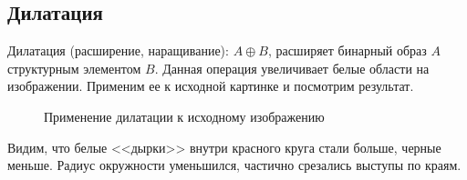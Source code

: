 \documentclass[a4paper, 12pt]{article}
\begin{document}
    \subsection{Дилатация}
    Дилатация (расширение, наращивание): $A\oplus B$, расширяет бинарный образ $A$ структурным элементом $B$. Данная операция
    увеличивает белые области на изображении. Применим ее к исходной картинке и посмотрим результат.
    \begin{figure}[H]
        \centering
        \captionsetup{skip=0pt}
        \caption{Применение дилатации к исходному изображению}
        \label{fig:dil1}
    \end{figure}
    Видим, что белые <<дырки>> внутри красного круга стали больше, черные меньше. Радиус окружности уменьшился, частично
    срезались выступы по краям.
\end{document}
